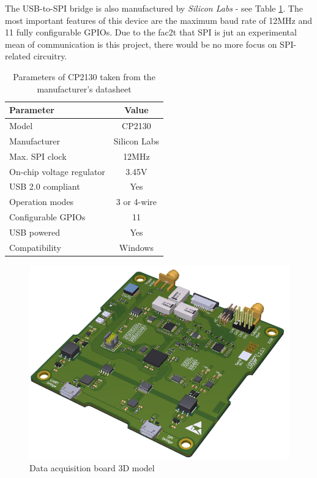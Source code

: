 \documentclass[12pt,a4paper]{article}
\begin{document}
The USB-to-SPI bridge is also manufactured by \textit{Silicon Labs} - see Table \ref{tab:cp2130_params}. The  most important features of this device are the maximum baud rate of 12MHz and 11 fully configurable GPIOs. Due to the fac2t that SPI is jut an experimental mean of communication is this project, there would be no more focus on SPI-related circuitry.

\begin{table}[ht!]
\begin{tabular}{|l|c|}
\hline
\textbf{Parameter}	& \textbf{Value} 	\\ \hline
Model  				& CP2130       \\ \hline
Manufacturer    	& Silicon Labs	\\ \hline
Max. SPI clock       	&  12MHz 		\\ \hline
On-chip voltage regulator     &  3.45V			\\ \hline
USB 2.0 compliant        &  Yes			\\ \hline
Operation modes        &  3 or 4-wire			\\ \hline
Configurable GPIOs 		&  11		\\ \hline
USB powered 	&  Yes 		\\ \hline
Compatibility 	&  Windows 		\\ \hline
\end{tabular}
\caption{Parameters of CP2130 taken from the manufacturer's datasheet \cite{cp2130_params}}
\label{tab:cp2130_params}
\end{table}

\begin{figure}[ht!]
\includegraphics[scale=0.9]{logger.png}
\caption{Data acquisition board 3D model}
\label{fig:logger3d}
\end{figure}
\end{document}
